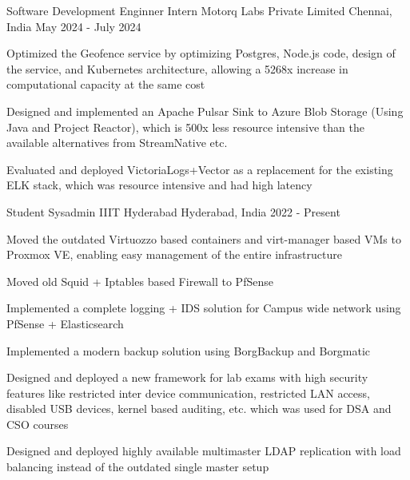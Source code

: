 
\begin{cventries}
  \cventry
  {Software Development Enginner Intern} %
  {Motorq Labs Private Limited} %
  {Chennai, India} %
  {May 2024 - July 2024} %
  {
  \begin{cvitems} %
    \item {Optimized the Geofence service by optimizing Postgres, Node.js code, design of the service, and Kubernetes architecture, allowing a 5268x increase in computational capacity at the same cost}
    \item {Designed and implemented an Apache Pulsar Sink to Azure Blob Storage (Using Java and Project Reactor), which is 500x less resource intensive than the available alternatives from StreamNative etc.}
    \item {Evaluated and deployed VictoriaLogs+Vector as a replacement for the existing ELK stack, which was resource intensive and had high latency}
  \end{cvitems}
  }

	\cventry
	  {Student Sysadmin} %
	  {IIIT Hyderabad} %
	  {Hyderabad, India} %
	  {2022 - Present} %
	  {
		\begin{cvitems} %
		  \item {Moved the outdated Virtuozzo based containers and virt-manager based VMs to Proxmox VE, enabling easy management of the entire infrastructure}
		  \item {Moved old Squid + Iptables based Firewall to PfSense}
		  \item {Implemented a complete logging + IDS solution for Campus wide network using PfSense + Elasticsearch}
		  \item {Implemented a modern backup solution using BorgBackup and Borgmatic}
		  \item {Designed and deployed a new framework for lab exams with high security features like restricted inter device communication, restricted LAN access, disabled USB devices, kernel based auditing, etc. which was used for DSA and CSO courses}
		  \item {Designed and deployed highly available multimaster LDAP replication with load balancing instead of the outdated single master setup}
		\end{cvitems}
	  }
    

\end{cventries}
